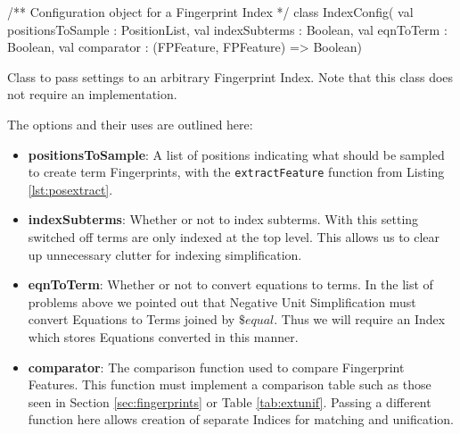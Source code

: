 \begin{listing}[H]
\begin{scalacode}
/** Configuration object for a Fingerprint Index */
class IndexConfig(
  val positionsToSample : PositionList,
  val indexSubterms     : Boolean,
  val eqnToTerm         : Boolean,
  val comparator        : (FPFeature, FPFeature) => Boolean)
\end{scalacode}
\caption{Class to pass settings to an arbitrary Fingerprint Index. Note that
this class does not require an implementation.}
\label{lst:config}
\end{listing}

The options and their uses are outlined here:

\begin{itemize}
\item \textbf{positionsToSample}: A list of positions indicating what should be sampled
to create term Fingerprints, with the \verb!extractFeature! function from Listing \ref{lst:posextract}.
\item \textbf{indexSubterms}: Whether or not to index subterms. With this setting switched
off terms are only indexed at the top level. This allows us to clear up unnecessary clutter
for indexing simplification.
\item \textbf{eqnToTerm}: Whether or not to convert equations to terms. In the list
of problems above we pointed out that Negative Unit Simplification
must convert Equations to Terms joined by $\$equal$. Thus we will require an Index
which stores Equations converted in this manner.
\item \textbf{comparator}: The comparison function used to compare Fingerprint Features.
This function must implement a comparison table such as those seen in Section 
\ref{sec:fingerprints} or Table \ref{tab:extunif}. Passing a different
function here allows creation of separate Indices for matching and unification.
\end{itemize}

